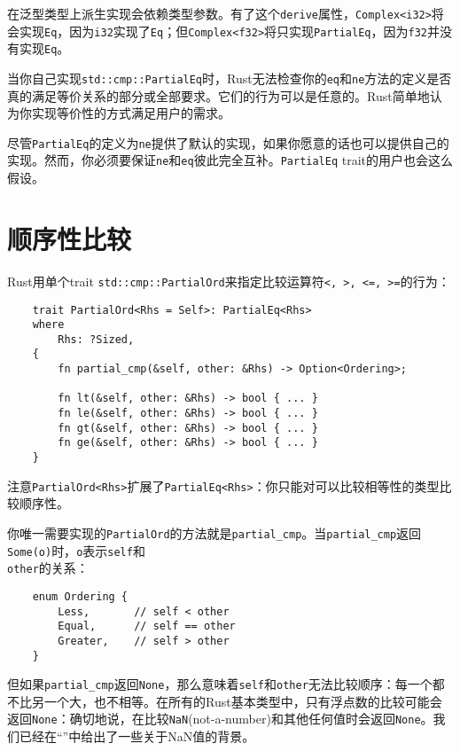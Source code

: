 在泛型类型上派生实现会依赖类型参数。有了这个\texttt{derive}属性，\texttt{Complex<i32>}将会实现\texttt{Eq}，因为\texttt{i32}实现了\texttt{Eq}；但\texttt{Complex<f32>}将只实现\texttt{PartialEq}，因为\texttt{f32}并没有实现\texttt{Eq}。

当你自己实现\texttt{std::cmp::PartialEq}时，Rust无法检查你的\texttt{eq}和\texttt{ne}方法的定义是否真的满足等价关系的部分或全部要求。它们的行为可以是任意的。Rust简单地认为你实现等价性的方式满足用户的需求。

尽管\texttt{PartialEq}的定义为\texttt{ne}提供了默认的实现，如果你愿意的话也可以提供自己的实现。然而，你必须要保证\texttt{ne}和\texttt{eq}彼此完全互补。\texttt{PartialEq} trait的用户也会这么假设。

\section{顺序性比较}\label{cmp}

Rust用单个trait \texttt{std::cmp::PartialOrd}来指定比较运算符\texttt{<, >, <=, >=}的行为：
\begin{verbatim}
    trait PartialOrd<Rhs = Self>: PartialEq<Rhs>
    where
        Rhs: ?Sized,
    {
        fn partial_cmp(&self, other: &Rhs) -> Option<Ordering>;

        fn lt(&self, other: &Rhs) -> bool { ... }
        fn le(&self, other: &Rhs) -> bool { ... }
        fn gt(&self, other: &Rhs) -> bool { ... }
        fn ge(&self, other: &Rhs) -> bool { ... }
    }
\end{verbatim}

注意\texttt{PartialOrd<Rhs>}扩展了\texttt{PartialEq<Rhs>}：你只能对可以比较相等性的类型比较顺序性。

你唯一需要实现的\texttt{PartialOrd}的方法就是\texttt{partial\_cmp}。当\texttt{partial\_cmp}返回\texttt{Some(o)}时，\texttt{o}表示\texttt{self}和\\
\texttt{other}的关系：
\begin{verbatim}
    enum Ordering {
        Less,       // self < other
        Equal,      // self == other
        Greater,    // self > other
    }
\end{verbatim}

但如果\texttt{partial\_cmp}返回\texttt{None}，那么意味着\texttt{self}和\texttt{other}无法比较顺序：每一个都不比另一个大，也不相等。在所有的Rust基本类型中，只有浮点数的比较可能会返回\texttt{None}：确切地说，在比较\texttt{NaN}(not-a-number)和其他任何值时会返回\texttt{None}。我们已经在“”中给出了一些关于NaN值的背景。

